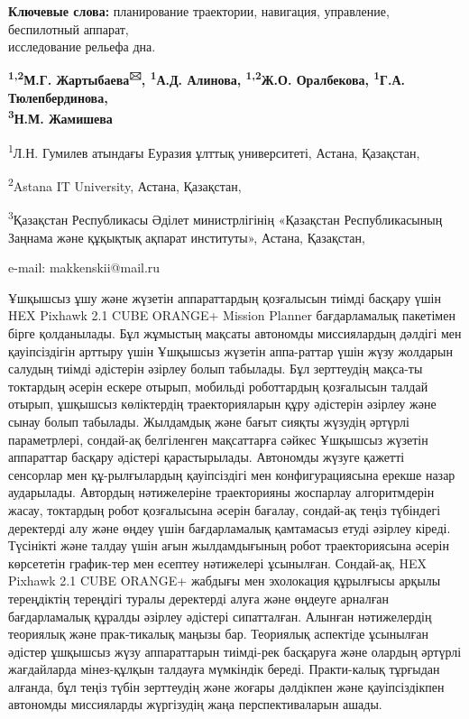 {\bfseries Ключевые слова:} планирование траектории, навигация, управление,
беспилотный аппарат,\\исследование рельефа дна.


\begin{center}
{\bfseries \textsuperscript{1,2}М.Г. Жартыбаева\textsuperscript{🖂},
\textsuperscript{1}А.Д. Алинова, \textsuperscript{1,2}Ж.О. Оралбекова,
\textsuperscript{1}Г.А. Тюлепбердинова,\\
\textsuperscript{3}Н.М. Жамишева}

\textsuperscript{1}Л.Н. Гумилев атындағы Еуразия ұлттық университеті,
Астана, Қазақстан,

\textsuperscript{2}Astana IT University, Астана, Қазақстан,

\textsuperscript{3}Қазақстан Республикасы Әділет министрлігінің
«Қазақстан Республикасының Заңнама және құқықтық ақпарат институты», Астана, Қазақстан,

e-mail: makkenskii@mail.ru
\end{center}

Ұшқышсыз ұшу және жүзетін аппараттардың қозғалысын тиімді басқару үшін
HEX Pixhawk 2.1 CUBE ORANGE+ Mission Planner бағдарламалық пакетімен
бірге қолданылады. Бұл жұмыстың мақсаты автономды миссиялардың дәлдігі
мен қауіпсіздігін арттыру үшін Ұшқышсыз жүзетін аппа-раттар үшін жүзу
жолдарын салудың тиімді әдістерін әзірлеу болып табылады. Бұл зерттеудің
мақса-ты токтардың әсерін ескере отырып, мобильді роботтардың қозғалысын
талдай отырып, ұшқышсыз көліктердің траекторияларын құру әдістерін
әзірлеу және сынау болып табылады. Жылдамдық және бағыт сияқты жүзудің
әртүрлі параметрлері, сондай-ақ белгіленген мақсаттарға сәйкес Ұшқышсыз
жүзетін аппараттар басқару әдістері қарастырылады. Автономды жүзуге
қажетті сенсорлар мен құ-рылғылардың қауіпсіздігі мен конфигурациясына
ерекше назар аударылады. Автордың нәтижелеріне траекторияны жоспарлау
алгоритмдерін жасау, токтардың робот қозғалысына әсерін бағалау,
сондай-ақ теңіз түбіндегі деректерді алу және өңдеу үшін бағдарламалық
қамтамасыз етуді әзірлеу кіреді. Түсінікті және талдау үшін ағын
жылдамдығының робот траекториясына әсерін көрсететін график-тер мен
есептеу нәтижелері ұсынылған. Сондай-ақ, HEX Pixhawk 2.1 CUBE ORANGE+
жабдығы мен эхолокация құрылғысы арқылы тереңдіктің тереңдігі туралы
деректерді алуға және өңдеуге арналған бағдарламалық құралды әзірлеу
әдістері сипатталған. Алынған нәтижелердің теориялық және прак-тикалық
маңызы бар. Теориялық аспектіде ұсынылған әдістер ұшқышсыз жүзу
аппараттарын тиімді-рек басқаруға және олардың әртүрлі жағдайларда
мінез-құлқын талдауға мүмкіндік береді. Практи-калық тұрғыдан алғанда,
бұл теңіз түбін зерттеудің және жоғары дәлдікпен және қауіпсіздікпен
автономды миссияларды жүргізудің жаңа перспективаларын ашады.

